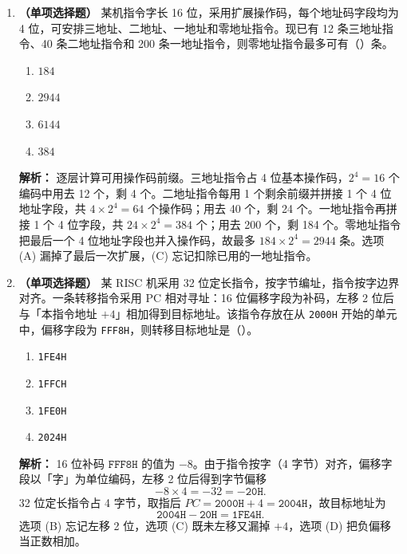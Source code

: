 \begin{enumerate}[leftmargin=*]

    \item \textbf{（单项选择题）}
    某机指令字长 16 位，采用扩展操作码，每个地址码字段均为 4 位，可安排三地址、二地址、一地址和零地址指令。现已有 12 条三地址指令、40 条二地址指令和 200 条一地址指令，则零地址指令最多可有（\quad）条。
    \begin{enumerate}[label=(\Alph*)]
        \item $184$
        \item $2944$
        \item $6144$
        \item $384$
    \end{enumerate}

    \ifshowsolutions\par\noindent\textbf{解析：} 逐层计算可用操作码前缀。三地址指令占 4 位基本操作码，$2^4=16$ 个编码中用去 12 个，剩 4 个。二地址指令每用 1 个剩余前缀并拼接 1 个 4 位地址字段，共 $4\times2^4=64$ 个操作码；用去 40 个，剩 24 个。一地址指令再拼接 1 个 4 位字段，共 $24\times2^4=384$ 个；用去 200 个，剩 184 个。零地址指令把最后一个 4 位地址字段也并入操作码，故最多 $184\times2^4=2944$ 条。选项 (A) 漏掉了最后一次扩展，(C) 忘记扣除已用的一地址指令。\else \answerarea \fi

    \vspace{8pt}

    \item \textbf{（单项选择题）}
    某 RISC 机采用 32 位定长指令，按字节编址，指令按字边界对齐。一条转移指令采用 PC 相对寻址：16 位偏移字段为补码，左移 2 位后与「本指令地址 $+4$」相加得到目标地址。该指令存放在从 \texttt{2000H} 开始的单元中，偏移字段为 \texttt{FFF8H}，则转移目标地址是（\quad）。
    \begin{enumerate}[label=(\Alph*)]
        \item \texttt{1FE4H}
        \item \texttt{1FFCH}
        \item \texttt{1FE0H}
        \item \texttt{2024H}
    \end{enumerate}

    \ifshowsolutions\par\noindent\textbf{解析：} 16 位补码 $\texttt{FFF8H}$ 的值为 $-8$。由于指令按字（4 字节）对齐，偏移字段以「字」为单位编码，左移 2 位后得到字节偏移
    \[
    -8\times4=-32=-\texttt{20H}.
    \]
    32 位定长指令占 4 字节，取指后 $PC=\texttt{2000H}+4=\texttt{2004H}$，故目标地址为
    \[
    \texttt{2004H}-\texttt{20H}=\texttt{1FE4H}.
    \]
    选项 (B) 忘记左移 2 位，选项 (C) 既未左移又漏掉 $+4$，选项 (D) 把负偏移当正数相加。\else \answerarea \fi


\end{enumerate}
